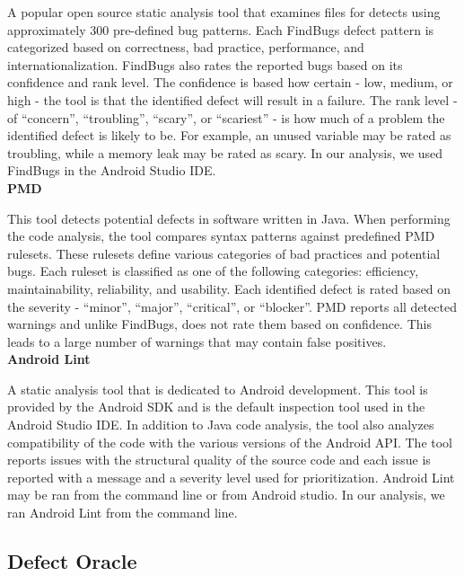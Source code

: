 \documentclass{sig-alternate}
\begin{document}
A popular open source static analysis tool that examines files for detects using approximately 300 pre-defined bug patterns. Each FindBugs defect pattern is categorized based on correctness, bad practice, performance, and internationalization. FindBugs also rates the reported bugs based on its confidence and rank level. The confidence is based how certain - low, medium, or high - the tool is that the identified defect will result in a failure. The rank level - of ``concern'', ``troubling'', ``scary'', or ``scariest'' - is how much of a problem the identified defect is likely to be. For example, an unused variable may be rated as troubling, while a memory leak may be rated as scary. In our analysis, we used FindBugs in the Android Studio IDE.\\


\noindent
\textbf{PMD}

This tool detects potential defects in software written in Java. When performing the code analysis, the tool compares syntax patterns against predefined PMD rulesets. These rulesets define various categories of bad practices and potential bugs. Each ruleset is classified as one of the following categories: efficiency, maintainability, reliability, and usability. Each identified defect is rated based on the severity - ``minor'', ``major'', ``critical'', or ``blocker''. PMD reports all detected warnings and unlike FindBugs, does not rate them based on confidence. This leads to a large number of warnings that may contain false positives.\\


\noindent
\textbf{Android Lint}

A static analysis tool that is dedicated to Android development. This tool is provided by the Android SDK and is the default inspection tool used in the Android Studio IDE. In addition to Java code analysis, the tool also analyzes compatibility of the code with the various versions of the Android API. The tool reports issues with the structural quality of the source code and each issue is reported with a message and a severity level used for prioritization. Android Lint may be ran from the command line or from Android studio. In our analysis, we ran Android Lint from the command line.\\



\subsection{Defect Oracle}
\end{document}
